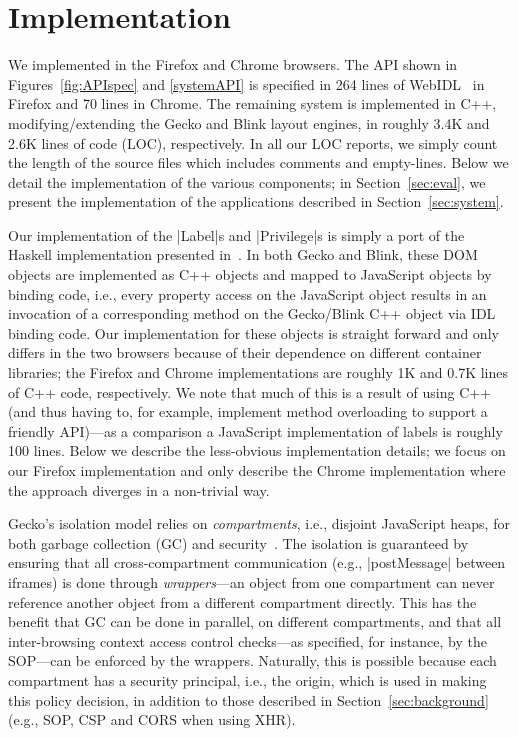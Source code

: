 \section{Implementation}
\label{sec:implementation}

We implemented \sys{} in the Firefox and Chrome browsers.
%
The API shown in Figures~\ref{fig:APIspec} and \ref{systemAPI} is specified in 264
lines of WebIDL~\cite{webidl} in Firefox and 70 lines in Chrome.
%
The remaining system is implemented in C++, modifying/extending the Gecko and
Blink layout engines, in roughly 3.4K and 2.6K lines of code (LOC),
respectively.
%
In all our LOC reports, we simply count the length of the source files which
includes comments and empty-lines.
%
Below we detail the implementation of the various \sys{} components;
in Section~\ref{sec:eval}, we present the implementation of the
applications described in Section~\ref{sec:system}.

%
Our implementation of the \js|Label|s and \js|Privilege|s is simply a port
of the Haskell implementation presented
in~\cite{stefan:2011:dclabels,stefan:2011:flexible}. 
%
In both Gecko and Blink, these DOM objects are implemented as C++ objects and
mapped to JavaScript objects by binding code, i.e., every property access on
the JavaScript object results in an invocation of a corresponding method on the
Gecko/Blink C++ object via IDL binding code.
%
Our implementation for these objects  is straight forward and only differs in
the two browsers because of their dependence on different container libraries;
the Firefox and Chrome implementations are roughly 1K and 0.7K lines of C++
code, respectively.
%
We note that much of this is a result of using C++ (and thus having
to, for example, implement method overloading to support a friendly
API)---as a comparison a JavaScript implementation of labels is
roughly 100 lines.
%
Below we describe the less-obvious implementation details; we focus on our
Firefox implementation and only describe the Chrome implementation where the
approach diverges in a non-trivial way.
%


Gecko's isolation model relies on \emph{compartments}, i.e., disjoint
JavaScript heaps, for both garbage collection (GC) and
security~\cite{wagner2011compartmental}.
%
The isolation is guaranteed by ensuring that all cross-compartment
communication (e.g., \js|postMessage| between iframes) is done through
\emph{wrappers}---an object from one compartment can never reference
another object from a different compartment directly.
%
This has the benefit that GC can be done in parallel, on different compartments,
and that all inter-browsing context access control checks---as specified, for
instance, by the SOP---can be enforced by the wrappers.
%
Naturally, this is possible because each compartment has a security
principal, i.e., the origin, which is used in making this policy
decision, in addition to those described in
Section~\ref{sec:background} (e.g., SOP, CSP and CORS when using XHR).

